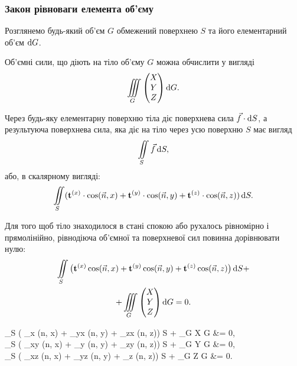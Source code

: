 \subsubsection{Закон рівноваги елемента об'єму}

Розглянемо будь-який об'єм $G$ обмежений поверхнею $S$ та його елементарний об'єм $\mathop{}\!\mathrm{d} G$. \medskip

Об'ємні сили, що діють на тіло об'єму $G$ можна обчислити у вигляді
\begin{equation}
	\displaystyle\iiint\limits_G \begin{pmatrix} X \\ Y \\ Z \end{pmatrix} \mathop{}\!\mathrm{d} G.
\end{equation}

Через будь-яку елементарну поверхню тіла діє поверхнева сила $\vec f \cdot \mathop{}\!\mathrm{d} S$, а результуюча поверхнева сила, яка діє на тіло через усю поверхню $S$ має вигляд 
\begin{equation}
	\displaystyle\iint\limits_S \vec f \mathop{}\!\mathrm{d} S,
\end{equation}
або, в скалярному вигляді:
\begin{equation}
	\displaystyle\iint\limits_S ( \textbf{t}^{(x)} \cdot \cos ( \vec n, x ) + \textbf{t}^{(y)} \cdot \cos(\vec n, y) + \textbf{t}^{(z)} \cdot \cos (\vec n, z) ) \mathop{}\!\mathrm{d} S.
\end{equation}

\begin{theorem}
	Для того щоб тіло знаходилося в стані спокою або рухалось рівномірно і прямолінійно, рівнодіюча об'ємної та поверхневої сил повинна дорівнювати нулю:
	\begin{multline}
		\displaystyle\iint\limits_S \big( \textbf{t}^{(x)} \cos(\vec n, x) + \textbf{t}^{(y)} \cos(\vec n, y) + \textbf{t}^{(z)} \cos(\vec n, z) \big) \mathop{}\!\mathrm{d} S + \\ 
		+ \displaystyle\iiint\limits_G \begin{pmatrix} X \\ Y \\ Z \end{pmatrix} \mathop{}\!\mathrm{d} G = 0.
	\end{multline}
\end{theorem}

\begin{theorem}
	\begin{system}
		\Iint_S \left( \sigma_x \cos(\vec n, x) + \tau_{yx} \cos(\vec n, y) + \tau_{zx} \cos(\vec n, z)\right) \diff S + \Iiint_G X \diff G &= 0, \\
		\Iint_S \left( \tau_{xy} \cos(\vec n, x) + \sigma_y \cos(\vec n, y) + \tau_{zy} \cos(\vec n, z)\right) \diff S + \Iiint_G Y \diff G &= 0, \\
		\Iint_S \left( \tau_{xz} \cos(\vec n, x) + \tau_{yz} \cos(\vec n, y) + \sigma_z \cos(\vec n, z)\right) \diff S + \Iiint_G Z \diff G &= 0.
	\end{system}
\end{theorem}

